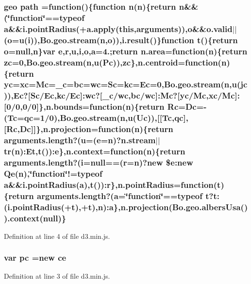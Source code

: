 \subsubsection[{path}]{ {\bf geo} path =function()\{function {\bf n}({\bf n})\{{\bf return} {\bf n}\&\&(\char`\"{}function\char`\"{}==typeof {\bf a}\&\&i.\+point\+Radius(+a.\+apply({\bf this},arguments)),{\bf o}\&\&o.\+valid$\vert$$\vert$({\bf o}=u({\bf i})),{\bf Bo.\+geo.\+stream}({\bf n},{\bf o})),i.\+result()\}function t()\{{\bf return} {\bf o}=null,{\bf n}\}var {\bf e},{\bf r},u,{\bf i},{\bf o},{\bf a}=4.;{\bf return} {\bf n.\+area}=function({\bf n})\{{\bf return} {\bf zc}=0,{\bf Bo.\+geo.\+stream}({\bf n},u({\bf Pc})),{\bf zc}\},{\bf n.\+centroid}=function({\bf n})\{{\bf return} {\bf yc}={\bf xc}={\bf Mc}={\bf \+\_\+c}={\bf bc}={\bf wc}={\bf Sc}={\bf kc}={\bf Ec}=0,{\bf Bo.\+geo.\+stream}({\bf n},u({\bf jc})),{\bf Ec}?[{\bf Sc}/{\bf Ec},{\bf kc}/{\bf Ec}]\+:{\bf wc}?[{\bf \+\_\+c}/{\bf wc},{\bf bc}/{\bf wc}]\+:{\bf Mc}?[{\bf yc}/{\bf Mc},{\bf xc}/{\bf Mc}]\+:[0/0,0/0]\},{\bf n.\+bounds}=function({\bf n})\{{\bf return} {\bf Rc}={\bf Dc}=-\/({\bf Tc}={\bf qc}=1/0),{\bf Bo.\+geo.\+stream}({\bf n},u({\bf Uc})),[[{\bf Tc},{\bf qc}],[{\bf Rc},{\bf Dc}]]\},{\bf n.\+projection}=function({\bf n})\{{\bf return} arguments.\+length?(u=({\bf e}={\bf n})?{\bf n.\+stream}$\vert$$\vert${\bf tr}({\bf n})\+:Et,t())\+:{\bf e}\},n.\+context=function({\bf n})\{{\bf return} arguments.\+length?({\bf i}=null==({\bf r}={\bf n})?new \$e\+:new Qe({\bf n}),\char`\"{}function\char`\"{}!=typeof {\bf a}\&\&i.\+point\+Radius({\bf a}),t())\+:{\bf r}\},n.\+point\+Radius=function(t)\{{\bf return} arguments.\+length?({\bf a}=\char`\"{}function\char`\"{}==typeof t?t\+:(i.\+point\+Radius(+t),+t),{\bf n})\+:{\bf a}\},{\bf n.\+projection}(Bo.\+geo.\+albers\+Usa()).context(null)\}}\label{d3_8min_8js_a8b33fd0cdabefd1487318dcbe09b74da}


Definition at line 4 of file d3.\+min.\+js.

\subsubsection[{pc}]{\setlength{\rightskip}{0pt plus 5cm}var pc =new ce}\label{d3_8min_8js_ad84057e5e00175fe176b18d3fe8eff11}


Definition at line 3 of file d3.\+min.\+js.

